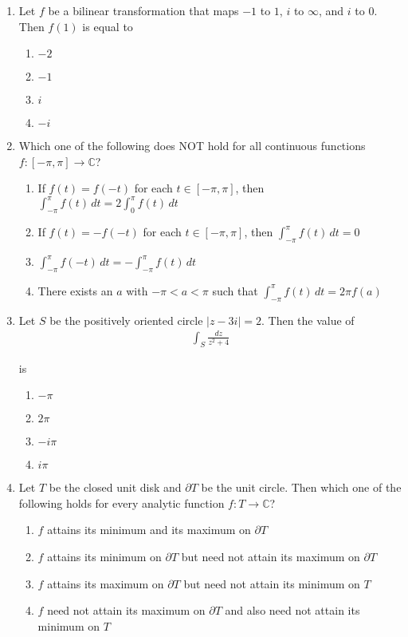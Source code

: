\documentclass[journal]{IEEEtran}
\numberwithin{equation}{enumi}
\numberwithin{figure}{enumi}
\begin{document}
\begin{enumerate}
\item
Let $f$ be a bilinear transformation that maps $-1$ to $1$, $i$ to $\infty$, and $i$ to $0$. Then $f(1)$ is equal to
\hfill{}
\begin{multicols}{4}
\begin{enumerate}
    \item $-2$
    \item $-1$
    \item $i$
    \item $-i$
\end{enumerate}
\end{multicols}


\item
Which one of the following does NOT hold for all continuous functions $f : [-\pi, \pi] \rightarrow \mathbb{C}$?
\hfill{}
\begin{enumerate}
    \item If $f(t) = f(-t)$ for each $t \in [-\pi, \pi]$, then $\int_{-\pi}^{\pi} f(t) \, dt = 2 \int_0^\pi f(t)\, dt$
    \item If $f(t) = -f(-t)$ for each $t \in [-\pi, \pi]$, then $\int_{-\pi}^{\pi} f(t) \, dt = 0$
    \item $\int_{-\pi}^{\pi} f(-t) \, dt = -\int_{-\pi}^{\pi} f(t)\, dt$
    \item There exists an $a$ with $-\pi < a < \pi$ such that $\int_{-\pi}^{\pi} f(t)\, dt = 2\pi f(a)$
\end{enumerate}

\item
Let $S$ be the positively oriented circle $|z-3i|=2$. Then the value of
\begin{align}
    \int_S \frac{dz}{z^2 + 4}
\end{align}

is
\hfill{}
\begin{multicols}{4}
\begin{enumerate}
    \item $-\pi$
    \item $2\pi$
    \item $-i\pi$
    \item $i\pi$
\end{enumerate}
\end{multicols}


\item
Let $T$ be the closed unit disk and $\partial T$ be the unit circle. Then which one of the following holds for every analytic function $f : T \to \mathbb{C}$?
\hfill{}
\begin{enumerate}
    \item $f$ attains its minimum and its maximum on $\partial T$
    \item $f$ attains its minimum on $\partial T$ but need not attain its maximum on $\partial T$
    \item $f$ attains its maximum on $\partial T$ but need not attain its minimum on $T$
    \item $f$ need not attain its maximum on $\partial T$ and also need not attain its minimum on $T$
\end{enumerate}


\end{enumerate}
\end{document}
